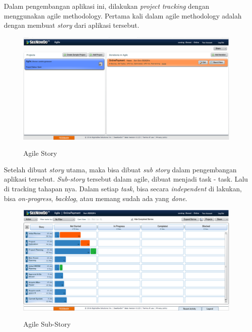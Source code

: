 \documentclass[9pt,twocolumn,twoside]{Gunadarma}
\begin{document}
Dalam pengembangan aplikasi ini, dilakukan \textit{project tracking} dengan menggunakan agile methodology. Pertama kali dalam agile methodology adalah dengan membuat \textit{story} dari aplikasi tersebut. 

\begin{figure}[htbp]
\begin{center}
\includegraphics[width=1\columnwidth]{Agile-1.eps} \label{fig:3-noFCase1}
\end{center}
\caption{Agile Story}
\end{figure}

Setelah dibuat \textit{story} utama, maka bisa dibuat \textit{sub story} dalam pengembangan aplikasi tersebut.
\textit{Sub-story} tersebut dalam agile, dibuat menjadi task - task. Lalu di tracking tahapan nya. Dalam setiap \textit{task}, bisa secara \textit{independent} di lakukan, bisa \textit{on-progress}, \textit{backlog}, atau memang sudah ada yang \textit{done}. 

\begin{figure}[htbp]
\begin{center}
\includegraphics[width=1\columnwidth]{Agile-2.eps} \label{fig:3-noFCase1}
\end{center}
\caption{Agile Sub-Story}
\end{figure}
\end{document}
